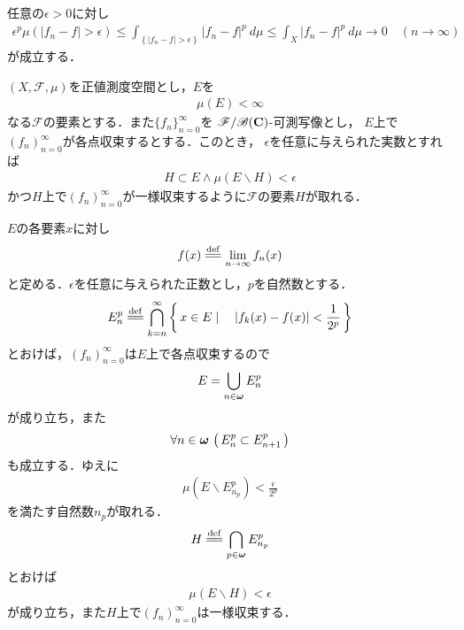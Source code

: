 		\begin{prf}
			任意の$\epsilon > 0$に対し
			\begin{align}
				\epsilon^p \mu\left(|f_n - f| > \epsilon\right)
				\leq \int_{\left\{|f_n - f| > \epsilon\right\}} |f_n-f|^p\ d\mu
				\leq \int_X |f_n - f|^p\ d\mu \longrightarrow 0
				\quad (n \longrightarrow \infty)
			\end{align}
			が成立する．
			\QED
		\end{prf}
		
		\begin{screen}
			\begin{thm}[Egorov]\label{thm:Egorov}
				$(X,\mathscr{F},\mu)$を正値測度空間とし，$E$を
				\begin{align}
					\mu(E) < \infty
				\end{align}
				なる$\mathscr{F}$の要素とする．また$\{f_n\}_{n = 0}^\infty$を
				$\mathscr{F}/\mathscr{B}(\mathbf{C})$-可測写像とし，
				$E$上で$(f_n)_{n = 0}^\infty$が各点収束するとする．このとき，
				$\epsilon$を任意に与えられた実数とすれば
				\begin{align}
					H \subset E \wedge \mu(E \backslash H) < \epsilon
				\end{align}
				かつ$H$上で$(f_n)_{n = 0}^\infty$が一様収束するように$\mathscr{F}$の要素$H$が取れる．
			\end{thm}
		\end{screen}
		
		\begin{sketch}
			$E$の各要素$x$に対し
			\begin{align}
				f(x) \defeq \lim_{n \to \infty} f_n(x)
			\end{align}
			と定める．$\epsilon$を任意に与えられた正数とし，$p$を自然数とする．
			\begin{align}
				E_n^p \defeq \bigcap_{k=n}^\infty \Set{x \in E}{|f_k(x) - f(x)| < \frac{1}{2^p}}
			\end{align}
			とおけば，$(f_n)_{n = 0}^\infty$は$E$上で各点収束するので
			\begin{align}
				E = \bigcup_{n \in {\boldsymbol \omega}} E_n^p
			\end{align}
			が成り立ち，また
			\begin{align}
				\forall n \in {\boldsymbol \omega}\, \left(\, E_n^p \subset E_{n+1}^p\, \right)
			\end{align}
			も成立する．ゆえに
			\begin{align}
				\mu(E \backslash E_{n_p}^p) < \frac{\epsilon}{2^p}
			\end{align}
			を満たす自然数$n_p$が取れる．
			\begin{align}
				H \defeq \bigcap_{p \in \Natural} E_{n_p}^p
			\end{align}
			とおけば
			\begin{align}
				\mu(E \backslash H) < \epsilon
			\end{align}
			が成り立ち，また$H$上で$(f_n)_{n = 0}^\infty$は一様収束する．
			\QED
		\end{sketch}